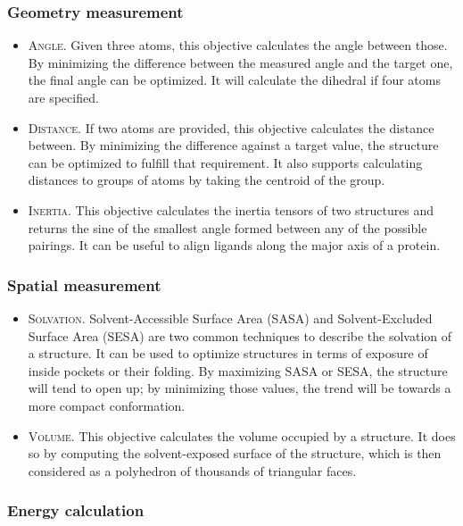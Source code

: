 \subsubsection{Geometry measurement}
\begin{itemize}
	\item \textsc{Angle}. Given three atoms, this objective calculates the angle between those. By minimizing the difference between the measured angle and the target one, the final angle can be optimized. It will calculate the dihedral if four atoms are specified.

	\item \textsc{Distance}. If two atoms are provided, this objective calculates the distance between. By minimizing the difference against a target value, the structure can be optimized to fulfill that requirement. It also supports calculating distances to groups of atoms by taking the centroid of the group.

	\item \textsc{Inertia}. This objective calculates the inertia tensors of two structures and returns the sine of the smallest angle formed between any of the possible pairings. It can be useful to align ligands along the major axis of a protein.


\end{itemize}\subsubsection{Spatial measurement}
\begin{itemize}
	\item \textsc{Solvation}. Solvent-Accessible Surface Area (SASA) and Solvent-Excluded Surface Area (SESA) are two common techniques to describe the solvation of a structure. It can be used to optimize structures in terms of exposure of inside pockets or their folding. By maximizing SASA or SESA, the structure will tend to open up; by minimizing those values, the trend will be towards a more compact conformation.

	\item \textsc{Volume}. This objective calculates the volume occupied by a structure. It does so by computing the solvent-exposed surface of the structure, which is then considered as a polyhedron of thousands of triangular faces.


\end{itemize}\subsubsection{Energy calculation}
